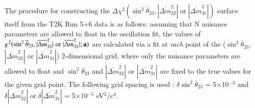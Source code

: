 
The procedure for constructing the $\Delta\chi^{2}(\sin^{2}\overline{\theta}_{23},|\overline{\Delta m}^{2}_{32}| \; \textrm{or} \; |\overline{\Delta m}^{2}_{31}|)$
surface itself from the T2K Run 5+6 data is 
as follows: 
assuming that N nuisance parameters are allowed to float in the oscillation fit,
the values of $\chi^{2}(\sin^{2}\overline{\theta}_{23},|\overline{\Delta m}^{2}_{32}| \; \textrm{or} \; |\overline{\Delta m}^{2}_{31}|; {\bf a})$
are calculated via a fit at \emph{each} point of the ($\sin^{2}\overline{\theta}_{23}$, $|\overline{\Delta m}^{2}_{32}|$ or $|\overline{\Delta m}^{2}_{31}|$)
2-dimensional grid, where only the nuisance parameters are allowed to float
and $\sin^{2}\overline{\theta}_{23}$ and $|\overline{\Delta m}^{2}_{32}|$ or $|\overline{\Delta m}^{2}_{31}|$ are fixed to the true values for the given grid point.
The following grid spacing is used
: $\delta{\sin^{2}\overline{\theta}_{23}}$ = 5$\times$10$^{-3}$ and
$\delta |\overline{\Delta m}^{2}_{32}| \; \textrm{or} \; \delta |\overline{\Delta m}^{2}_{31}|$ = 5$\times$10$^{-5}$ eV$^{2}$/c$^{4}$.

